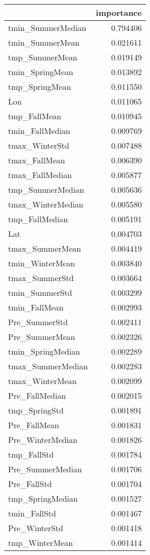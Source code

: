 \begin{tabular}{lr}
\toprule
 & importance \\
\midrule
tmin_SummerMedian & 0.794406 \\
tmin_SummerMean & 0.021611 \\
tmp_SummerMean & 0.019149 \\
tmin_SpringMean & 0.013892 \\
tmp_SpringMean & 0.011550 \\
Lon & 0.011065 \\
tmp_FallMean & 0.010945 \\
tmin_FallMedian & 0.009769 \\
tmax_WinterStd & 0.007488 \\
tmax_FallMean & 0.006390 \\
tmax_FallMedian & 0.005877 \\
tmp_SummerMedian & 0.005636 \\
tmax_WinterMedian & 0.005580 \\
tmp_FallMedian & 0.005191 \\
Lat & 0.004703 \\
tmax_SummerMean & 0.004419 \\
tmin_WinterMean & 0.003840 \\
tmax_SummerStd & 0.003664 \\
tmin_SummerStd & 0.003299 \\
tmin_FallMean & 0.002993 \\
Pre_SummerStd & 0.002411 \\
Pre_SummerMean & 0.002326 \\
tmin_SpringMedian & 0.002289 \\
tmax_SummerMedian & 0.002283 \\
tmax_WinterMean & 0.002099 \\
Pre_FallMedian & 0.002015 \\
tmp_SpringStd & 0.001891 \\
Pre_FallMean & 0.001831 \\
Pre_WinterMedian & 0.001826 \\
tmp_FallStd & 0.001784 \\
Pre_SummerMedian & 0.001706 \\
Pre_FallStd & 0.001704 \\
tmp_SpringMedian & 0.001527 \\
tmin_FallStd & 0.001467 \\
Pre_WinterStd & 0.001418 \\
tmp_WinterMean & 0.001414 \\

\end{tabular}
